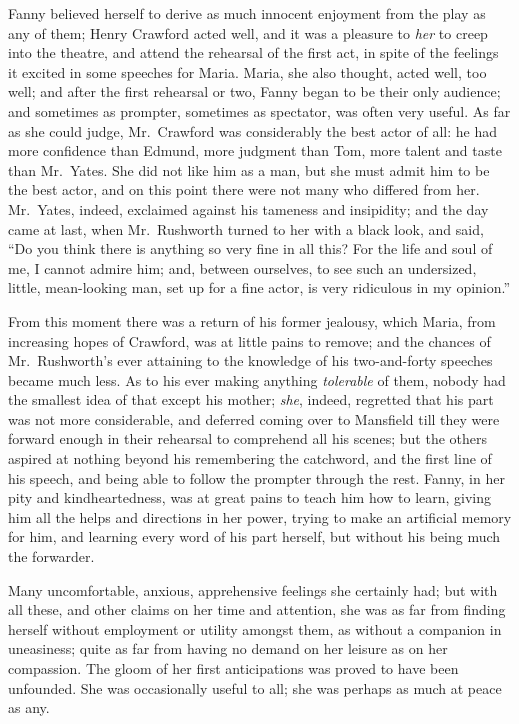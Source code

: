 Fanny believed herself to derive as much innocent enjoyment
from the play as any of them; Henry Crawford acted well,
and it was a pleasure to \emph{her} to creep into the theatre,
and attend the rehearsal of the first act, in spite of the
feelings it excited in some speeches for Maria.  Maria, she
also thought, acted well, too well; and after the first
rehearsal or two, Fanny began to be their only audience;
and sometimes as prompter, sometimes as spectator,
was often very useful.  As far as she could judge,
Mr.\ Crawford was considerably the best actor of all:
he had more confidence than Edmund, more judgment than Tom,
more talent and taste than Mr.\ Yates.  She did not like him
as a man, but she must admit him to be the best actor,
and on this point there were not many who differed from her.
Mr.\ Yates, indeed, exclaimed against his tameness
and insipidity; and the day came at last, when Mr.\ Rushworth
turned to her with a black look, and said, ``Do you think
there is anything so very fine in all this?  For the life
and soul of me, I cannot admire him; and, between ourselves,
to see such an undersized, little, mean-looking man,
set up for a fine actor, is very ridiculous in my opinion.''

From this moment there was a return of his former jealousy,
which Maria, from increasing hopes of Crawford, was at
little pains to remove; and the chances of Mr.\ Rushworth's
ever attaining to the knowledge of his two-and-forty
speeches became much less.  As to his ever making anything
\emph{tolerable} of them, nobody had the smallest idea of that
except his mother; \emph{she}, indeed, regretted that his part
was not more considerable, and deferred coming over to
Mansfield till they were forward enough in their rehearsal
to comprehend all his scenes; but the others aspired at
nothing beyond his remembering the catchword, and the first
line of his speech, and being able to follow the prompter
through the rest.  Fanny, in her pity and kindheartedness,
was at great pains to teach him how to learn, giving him
all the helps and directions in her power, trying to make
an artificial memory for him, and learning every word
of his part herself, but without his being much the forwarder.

Many uncomfortable, anxious, apprehensive feelings she
certainly had; but with all these, and other claims
on her time and attention, she was as far from finding
herself without employment or utility amongst them,
as without a companion in uneasiness; quite as far from
having no demand on her leisure as on her compassion.
The gloom of her first anticipations was proved to have
been unfounded.  She was occasionally useful to all;
she was perhaps as much at peace as any.

